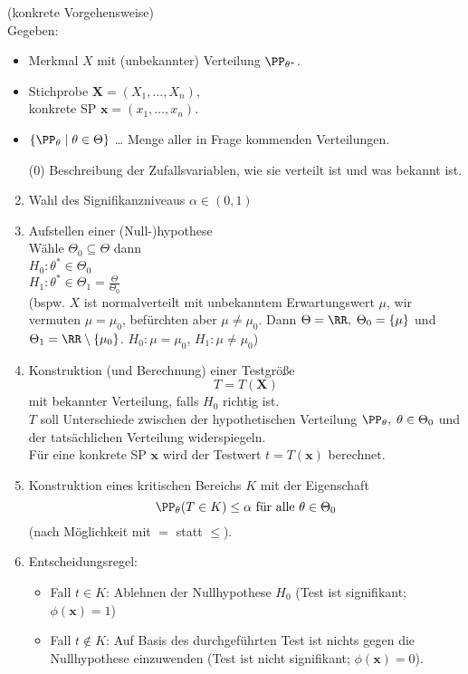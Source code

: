 \documentclass{scrreprt}
\begin{document}
 (konkrete Vorgehensweise)\\
Gegeben:
\begin{itemize}
\item Merkmal $X$ mit (unbekannter) Verteilung $\PP_{\theta^*}$.
\item Stichprobe $\mathbf{X} = (X_1, \ldots, X_n)$, \\
konkrete SP $\mathbf{x}=(x_1, \ldots, x_n)$.
\item $\{\PP_\theta \;|\; \theta \in \Theta\}$ … Menge aller in Frage kommenden Verteilungen.
\end{itemize}
\begin{enumerate}
\item[(0)] Beschreibung der Zufallsvariablen, wie sie verteilt ist und was bekannt ist.
\item Wahl des Signifikanzniveaus $\alpha \in (0,1)$
\item Aufstellen einer (Null-)hypothese\\
Wähle $\Theta_0 \subseteq \Theta$ dann \\
$H_0: \theta^* \in \Theta_0$ \\
$H_1: \theta^* \in \Theta_1 = \frac{\Theta}{\Theta_0}$\\
(bspw. $X$ ist normalverteilt mit unbekanntem Erwartungswert $\mu$, wir vermuten $\mu = \mu_0$, befürchten aber $\mu \not = \mu_0$. Dann $\Theta = \RR, \; \Theta_0 =\{\mu\}$ und $\Theta_1 = \RR\setminus \{\mu_0\}$. $H_0: \mu=\mu_0$, $H_1: \mu \not = \mu_0$)
\item Konstruktion (und Berechnung) einer Testgröße
$$T=T(\mathbf{X})$$
mit bekannter Verteilung, falls $H_0$ richtig ist.\\
$T$ soll Unterschiede zwischen der hypothetischen Verteilung $\PP_\theta, \; \theta \in \Theta_0$ und der tatsächlichen Verteilung widerspiegeln.\\
Für eine konkrete SP $\mathbf{x}$ wird der Testwert $t=T(\mathbf{x})$ berechnet.
\item Konstruktion eines kritischen Bereichs $K$ mit der Eigenschaft
$$\PP_\theta (T\in K) \leq \alpha \text{ für alle }\theta \in \Theta_0$$
(nach Möglichkeit mit $=$ statt $\leq $).
\item Entscheidungsregel:
\begin{itemize}
\item Fall $t\in K$: Ablehnen der Nullhypothese $H_0$ (Test ist signifikant; $\phi(\mathbf{x})=1$)
\item Fall $t \not \in K$: Auf Basis des durchgeführten Test ist nichts gegen die Nullhypothese einzuwenden (Test ist nicht signifikant; $\phi(\mathbf{x})=0$).
\end{itemize}
\end{enumerate}
\end{document}
